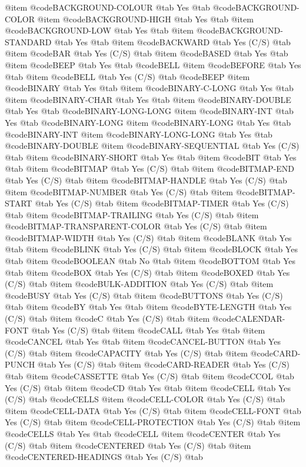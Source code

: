 @item @code{BACKGROUND-COLOUR} @tab Yes @tab @code{BACKGROUND-COLOR}
@item @code{BACKGROUND-HIGH} @tab Yes @tab
@item @code{BACKGROUND-LOW} @tab Yes @tab
@item @code{BACKGROUND-STANDARD} @tab Yes @tab
@item @code{BACKWARD} @tab Yes (C/S) @tab
@item @code{BAR} @tab Yes (C/S) @tab
@item @code{BASED} @tab Yes @tab
@item @code{BEEP} @tab Yes @tab @code{BELL}
@item @code{BEFORE} @tab Yes @tab
@item @code{BELL} @tab Yes	(C/S) @tab @code{BEEP}
@item @code{BINARY} @tab Yes @tab
@item @code{BINARY-C-LONG} @tab Yes @tab
@item @code{BINARY-CHAR} @tab Yes @tab
@item @code{BINARY-DOUBLE} @tab Yes @tab @code{BINARY-LONG-LONG}
@item @code{BINARY-INT} @tab Yes @tab @code{BINARY-LONG}
@item @code{BINARY-LONG} @tab Yes @tab @code{BINARY-INT}
@item @code{BINARY-LONG-LONG} @tab Yes @tab @code{BINARY-DOUBLE}
@item @code{BINARY-SEQUENTIAL} @tab Yes	(C/S) @tab
@item @code{BINARY-SHORT} @tab Yes @tab
@item @code{BIT} @tab Yes @tab
@item @code{BITMAP} @tab Yes	(C/S) @tab
@item @code{BITMAP-END} @tab Yes	(C/S) @tab
@item @code{BITMAP-HANDLE} @tab Yes	(C/S) @tab
@item @code{BITMAP-NUMBER} @tab Yes	(C/S) @tab
@item @code{BITMAP-START} @tab Yes	(C/S) @tab
@item @code{BITMAP-TIMER} @tab Yes	(C/S) @tab
@item @code{BITMAP-TRAILING} @tab Yes	(C/S) @tab
@item @code{BITMAP-TRANSPARENT-COLOR} @tab Yes	(C/S) @tab
@item @code{BITMAP-WIDTH} @tab Yes	(C/S) @tab
@item @code{BLANK} @tab Yes @tab
@item @code{BLINK} @tab Yes	(C/S) @tab
@item @code{BLOCK} @tab Yes @tab
@item @code{BOOLEAN} @tab No @tab
@item @code{BOTTOM} @tab Yes @tab
@item @code{BOX} @tab Yes	(C/S) @tab
@item @code{BOXED} @tab Yes	(C/S) @tab
@item @code{BULK-ADDITION} @tab Yes	(C/S) @tab
@item @code{BUSY} @tab Yes	(C/S) @tab
@item @code{BUTTONS} @tab Yes	(C/S) @tab
@item @code{BY} @tab Yes @tab
@item @code{BYTE-LENGTH} @tab Yes	(C/S) @tab
@item @code{C} @tab Yes	(C/S) @tab
@item @code{CALENDAR-FONT} @tab Yes	(C/S) @tab
@item @code{CALL} @tab Yes @tab
@item @code{CANCEL} @tab Yes @tab
@item @code{CANCEL-BUTTON} @tab Yes	(C/S) @tab
@item @code{CAPACITY} @tab Yes	(C/S) @tab
@item @code{CARD-PUNCH} @tab Yes	(C/S) @tab
@item @code{CARD-READER} @tab Yes	(C/S) @tab
@item @code{CASSETTE} @tab Yes	(C/S) @tab
@item @code{CCOL} @tab Yes	(C/S) @tab
@item @code{CD} @tab Yes @tab
@item @code{CELL} @tab Yes	(C/S) @tab @code{CELLS}
@item @code{CELL-COLOR} @tab Yes	(C/S) @tab
@item @code{CELL-DATA} @tab Yes	(C/S) @tab
@item @code{CELL-FONT} @tab Yes	(C/S) @tab
@item @code{CELL-PROTECTION} @tab Yes	(C/S) @tab
@item @code{CELLS} @tab Yes @tab @code{CELL}
@item @code{CENTER} @tab Yes	(C/S) @tab
@item @code{CENTERED} @tab Yes	(C/S) @tab
@item @code{CENTERED-HEADINGS} @tab Yes	(C/S) @tab
